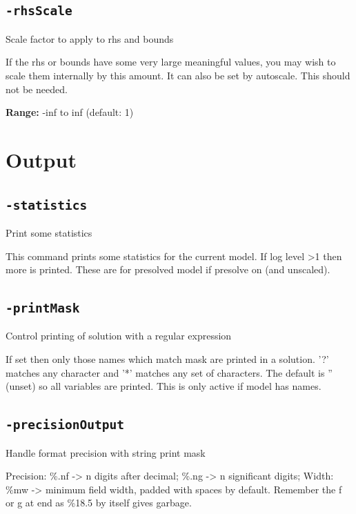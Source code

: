 \documentclass[11pt,a4paper]{article}
\begin{document}
\subsection*{\texttt{-rhsScale}}

Scale factor to apply to rhs and bounds

If the rhs or bounds have some very large meaningful values, you may wish to scale them internally by this amount.  It can also be set by autoscale.  This should not be needed.

\textbf{Range:} -inf to inf (default: 1)

\section{Output}

\subsection*{\texttt{-statistics}}

Print some statistics

This command prints some statistics for the current model. If log level >1 then more is printed. These are for presolved model if presolve on (and unscaled).

\subsection*{\texttt{-printMask}}

Control printing of solution with a regular expression

If set then only those names which match mask are printed in a solution. '?' matches any character and '*' matches any set of characters.  The default is '' (unset) so all variables are printed. This is only active if model has names.

\subsection*{\texttt{-precisionOutput}}

Handle format precision with string print mask

Precision: \%.nf -> n digits after decimal; \%.ng -> n significant digits; Width: \%mw -> minimum field width, padded with spaces by default. Remember the f or g at end as \%18.5 by itself gives garbage.
\end{document}
